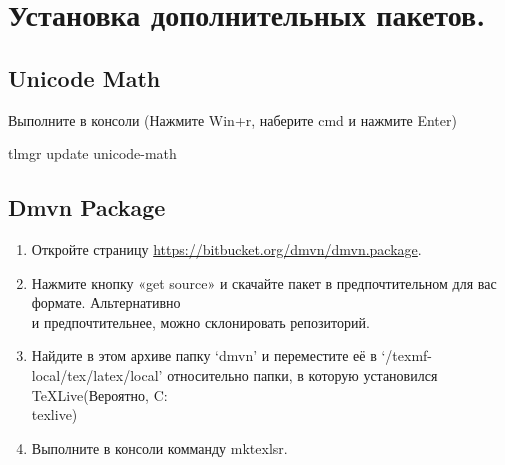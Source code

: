 \section{Установка дополнительных пакетов.}

\subsection{Unicode Math}
Выполните в консоли (Нажмите Win+r, наберите {\ttfamily cmd} и нажмите {\ttfamily Enter})\par
{\ttfamily tlmgr update unicode-math}

\subsection{Dmvn Package}
\begin{enumerate}
  \item Откройте страницу \url{https://bitbucket.org/dmvn/dmvn.package}.
  \item Нажмите кнопку «get source» и скачайте пакет в предпочтительном для вас формате. Альтернативно \\
    и предпочтительнее, можно склонировать репозиторий. 
  \item Найдите в этом архиве папку `{\ttfamily dmvn}'  и переместите её в `{\ttfamily /texmf-local/tex/latex/local}' относительно папки, в которую установился
  TeXLive(Вероятно, {\ttfamily C:\\texlive}) 
  \item Выполните в консоли комманду {\ttfamily mktexlsr}.
\end{enumerate}

